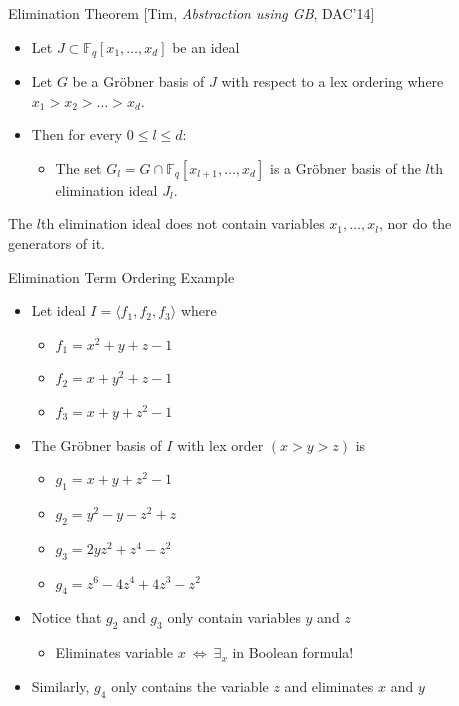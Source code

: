 \documentclass[xcolor=dvipsnames]{beamer}
\newcommand{\Fq}{{\mathbb{F}}_{q}}
\newcommand{\Grobner}{Gr\"{o}bner\xspace}
\begin{document}
\begin{frame}{\large {Elimination Theorem [Tim, {\it Abstraction using GB}, DAC'14]}}
\begin{itemize}
\item Let $J \subset \Fq[x_1,\dots,x_d]$ be an ideal
\end{itemize}
\begin{itemize}
\item Let $G$ be a \Grobner basis of $J$ with respect to a lex ordering where $x_1
> x_2 > \dots > x_d$.
\end{itemize}
\begin{itemize}
\item Then for every $0 \leq l \leq d$:
	\begin{itemize}	
	\item The set $G_l= G \cap \Fq[x_{l+1},\dots,x_d]$ is a Gr\"obner basis of the $l$th elimination ideal $J_l$.
	\end{itemize}
\end{itemize}

The $l$th elimination ideal does not contain variables
$x_1,\dots,x_l$, nor do the generators of it.

\end{frame}


\begin{frame}{\large {Elimination Term Ordering Example}}
\begin{itemize}
\item Let ideal $I = \langle f_1, f_2, f_3 \rangle$ where
	\begin{itemize}
	\item $f_1 = x^2 + y + z - 1$
	\item $f_2 = x + y^2 + z - 1$
	\item $f_3 = x + y + z^2 - 1$
	\end{itemize}
\item The \Grobner basis of $I$ with lex order $(x > y > z)$ is
	\begin{itemize}
	\item $g_1 = x + y + z^2 - 1$
	\item $g_2 = y^2 - y - z^2 + z$
	\item $g_3 = 2yz^2 + z^4 - z^2$
	\item $g_4 = z^6 - 4z^4 + 4z^3 - z^2$
	\end{itemize}
\item Notice that $g_2$ and $g_3$ only contain variables $y$ and $z$
	\begin{itemize}
	\item Eliminates variable $x~\Leftrightarrow  ~\exists_x$ in Boolean formula!
	\end{itemize}
\item Similarly, $g_4$ only contains the variable $z$ and eliminates $x$ and $y$
\end{itemize}
\end{frame}
\end{document}
